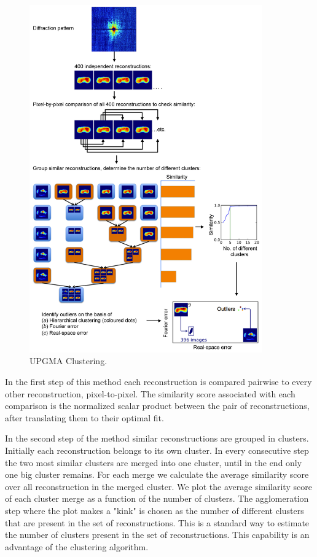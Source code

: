 \begin{figure}[h]
	\centering 
		\includegraphics[width=100mm]{UPGMA_Clustering.jpg}
	\caption{UPGMA Clustering.}
	\label{fig:UPGMA}
\end{figure}

In the first step of this method each reconstruction is compared pairwise to every other reconstruction, pixel-to-pixel. The similarity score associated with each comparison is the normalized scalar product between the pair of reconstructions, after translating them to their optimal fit. 

In the second step of the method similar reconstructions are grouped in clusters. Initially each reconstruction belongs to its own cluster. In every consecutive step the two most similar clusters are merged into one cluster, until in the end only one big cluster remains. For each merge we calculate the average similarity score over all reconstruction in the merged cluster. We plot the average similarity score of each cluster merge as a function of the number of clusters. The agglomeration step where the plot makes a "kink" is chosen as the number of different clusters that are present in the set of reconstructions. This is a standard way to estimate the number of clusters present in the set of reconstructions. This capability is an advantage of the  clustering algorithm. 

